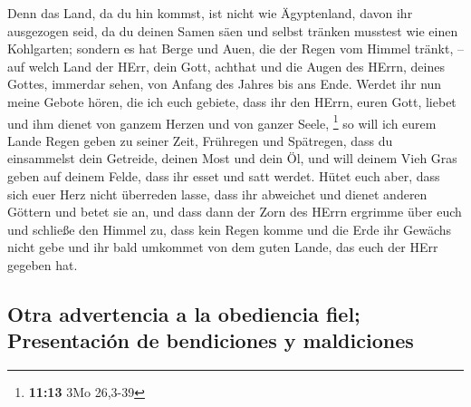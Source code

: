  Denn das Land, da du hin kommst, ist nicht wie
Ägyptenland, davon ihr ausgezogen seid, da du deinen Samen säen und
selbst tränken musstest wie einen Kohlgarten;  sondern es
hat Berge und Auen, die der Regen vom Himmel tränkt, -- 
auf welch Land der HErr, dein Gott, achthat und die Augen des HErrn,
deines Gottes, immerdar sehen, von Anfang des Jahres bis ans Ende.
 Werdet ihr nun meine Gebote hören, die ich euch gebiete,
dass ihr den HErrn, euren Gott, liebet und ihm dienet von ganzem Herzen
und von ganzer Seele, \footnote{\textbf{11:13} 3Mo 26,3-39}
 so will ich eurem Lande Regen geben zu seiner Zeit,
Frühregen und Spätregen, dass du einsammelst dein Getreide, deinen Most
und dein Öl,  und will deinem Vieh Gras geben auf deinem
Felde, dass ihr esset und satt werdet.  Hütet euch aber,
dass sich euer Herz nicht überreden lasse, dass ihr abweichet und dienet
anderen Göttern und betet sie an,  und dass dann der Zorn
des HErrn ergrimme über euch und schließe den Himmel zu, dass kein Regen
komme und die Erde ihr Gewächs nicht gebe und ihr bald umkommet von dem
guten Lande, das euch der HErr gegeben hat.

\hypertarget{otra-advertencia-a-la-obediencia-fiel-presentaciuxf3n-de-bendiciones-y-maldiciones}{%
\subsection{Otra advertencia a la obediencia fiel; Presentación de
bendiciones y
maldiciones}\label{otra-advertencia-a-la-obediencia-fiel-presentaciuxf3n-de-bendiciones-y-maldiciones}}


